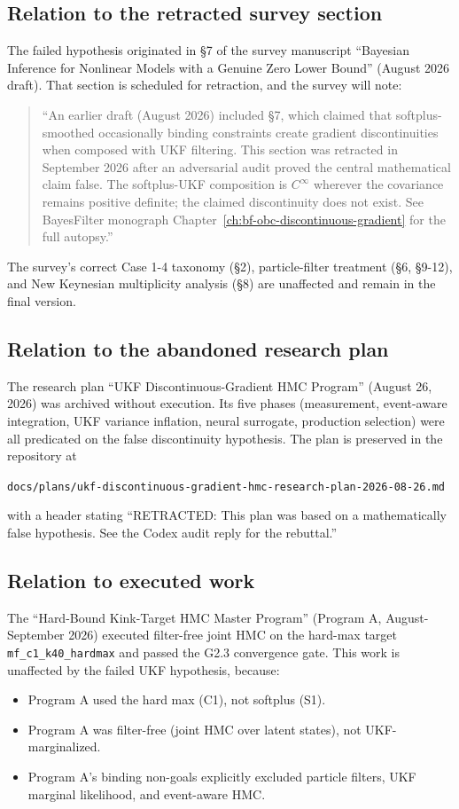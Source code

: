 \subsection{Relation to the retracted survey section}

The failed hypothesis originated in §7 of the survey manuscript ``Bayesian Inference for Nonlinear Models with a Genuine Zero Lower Bound'' (August 2026 draft). That section is scheduled for retraction, and the survey will note:
\begin{quote}
``An earlier draft (August 2026) included §7, which claimed that softplus-smoothed occasionally binding constraints create gradient discontinuities when composed with UKF filtering. This section was retracted in September 2026 after an adversarial audit proved the central mathematical claim false. The softplus-UKF composition is $C^\infty$ wherever the covariance remains positive definite; the claimed discontinuity does not exist. See BayesFilter monograph Chapter~\ref{ch:bf-obc-discontinuous-gradient} for the full autopsy.''
\end{quote}

The survey's correct Case 1-4 taxonomy (§2), particle-filter treatment (§6, §9-12), and New Keynesian multiplicity analysis (§8) are unaffected and remain in the final version.

\subsection{Relation to the abandoned research plan}

The research plan ``UKF Discontinuous-Gradient HMC Program'' (August 26, 2026) was archived without execution. Its five phases (measurement, event-aware integration, UKF variance inflation, neural surrogate, production selection) were all predicated on the false discontinuity hypothesis. The plan is preserved in the repository at
\begin{center}
\texttt{docs/plans/ukf-discontinuous-gradient-hmc-research-plan-2026-08-26.md}
\end{center}
with a header stating ``RETRACTED: This plan was based on a mathematically false hypothesis. See the Codex audit reply for the rebuttal.''

\subsection{Relation to executed work}

The ``Hard-Bound Kink-Target HMC Master Program'' (Program A, August-September 2026) executed filter-free joint HMC on the hard-max target \texttt{mf\_c1\_k40\_hardmax} and passed the G2.3 convergence gate. This work is unaffected by the failed UKF hypothesis, because:
\begin{itemize}
\item Program A used the hard max (C1), not softplus (S1).
\item Program A was filter-free (joint HMC over latent states), not UKF-marginalized.
\item Program A's binding non-goals explicitly excluded particle filters, UKF marginal likelihood, and event-aware HMC.
\end{itemize}

